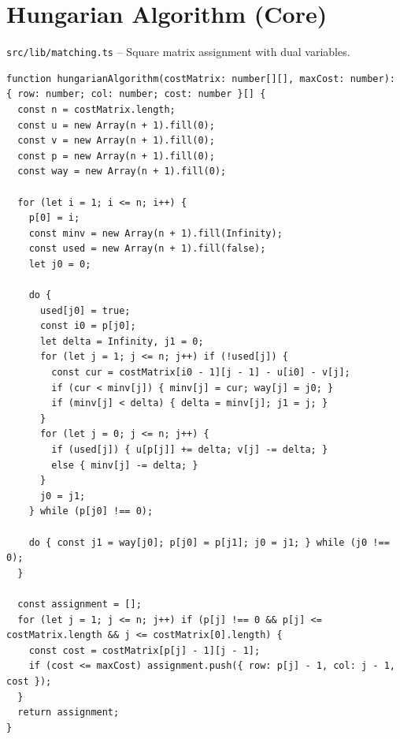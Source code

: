 \section{Hungarian Algorithm (Core)}
\label{sec:code-hungarian}
\texttt{src/lib/matching.ts} -- Square matrix assignment with dual variables.

\begin{lstlisting}[style=typescript, caption={hungarianAlgorithm()}, label={lst:hungarian}]
function hungarianAlgorithm(costMatrix: number[][], maxCost: number): { row: number; col: number; cost: number }[] {
  const n = costMatrix.length;
  const u = new Array(n + 1).fill(0);
  const v = new Array(n + 1).fill(0);
  const p = new Array(n + 1).fill(0);
  const way = new Array(n + 1).fill(0);

  for (let i = 1; i <= n; i++) {
    p[0] = i;
    const minv = new Array(n + 1).fill(Infinity);
    const used = new Array(n + 1).fill(false);
    let j0 = 0;

    do {
      used[j0] = true;
      const i0 = p[j0];
      let delta = Infinity, j1 = 0;
      for (let j = 1; j <= n; j++) if (!used[j]) {
        const cur = costMatrix[i0 - 1][j - 1] - u[i0] - v[j];
        if (cur < minv[j]) { minv[j] = cur; way[j] = j0; }
        if (minv[j] < delta) { delta = minv[j]; j1 = j; }
      }
      for (let j = 0; j <= n; j++) {
        if (used[j]) { u[p[j]] += delta; v[j] -= delta; }
        else { minv[j] -= delta; }
      }
      j0 = j1;
    } while (p[j0] !== 0);

    do { const j1 = way[j0]; p[j0] = p[j1]; j0 = j1; } while (j0 !== 0);
  }

  const assignment = [];
  for (let j = 1; j <= n; j++) if (p[j] !== 0 && p[j] <= costMatrix.length && j <= costMatrix[0].length) {
    const cost = costMatrix[p[j] - 1][j - 1];
    if (cost <= maxCost) assignment.push({ row: p[j] - 1, col: j - 1, cost });
  }
  return assignment;
}
\end{lstlisting}